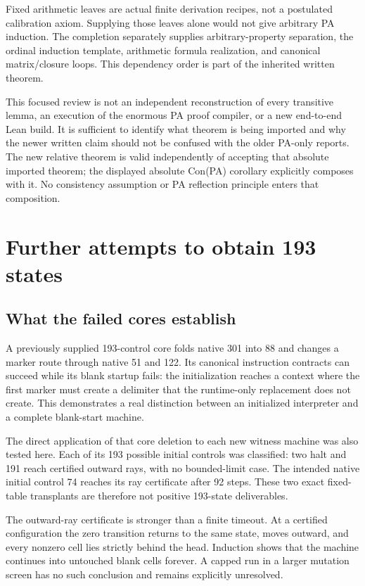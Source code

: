 \documentclass[10pt,letterpaper]{article}
\begin{document}
Fixed arithmetic leaves are actual finite derivation recipes, not a
postulated calibration axiom.  Supplying those leaves alone would not
give arbitrary PA induction.  The completion separately supplies
arbitrary-property separation, the ordinal induction template,
arithmetic formula realization, and canonical matrix/closure loops.
This dependency order is part of the inherited written theorem.

This focused review is not an independent reconstruction of every
transitive lemma, an execution of the enormous PA proof compiler, or a
new end-to-end Lean build.  It is sufficient to identify what theorem
is being imported and why the newer written claim should not be
confused with the older PA-only reports.  The new relative theorem is
valid independently of accepting that absolute imported theorem; the
displayed absolute Con(PA) corollary explicitly composes with it.
No consistency assumption or PA reflection principle enters that
composition.

\section{Further attempts to obtain 193 states}
\label{sec:search}



\subsection{What the failed cores establish}

A previously supplied 193-control core folds native 301 into 88 and
changes a marker route through native 51 and 122.  Its canonical
instruction contracts can succeed while its blank startup fails: the
initialization reaches a context where the first marker must create a
delimiter that the runtime-only replacement does not create.  This
demonstrates a real distinction between an initialized interpreter and
a complete blank-start machine.

The direct application of that core deletion to each new witness
machine was also tested here.  Each of its 193 possible initial controls
was classified: two halt and 191 reach certified outward rays, with no
bounded-limit case.  The intended native initial control 74 reaches
its ray certificate after 92 steps.  These two exact fixed-table
transplants are therefore not positive 193-state deliverables.

The outward-ray certificate is stronger than a finite timeout.  At a
certified configuration the zero transition returns to the same state,
moves outward, and every nonzero cell lies strictly behind the head.
Induction shows that the machine continues into untouched blank cells
forever.  A capped run in a larger mutation screen has no such conclusion
and remains explicitly unresolved.
\end{document}
